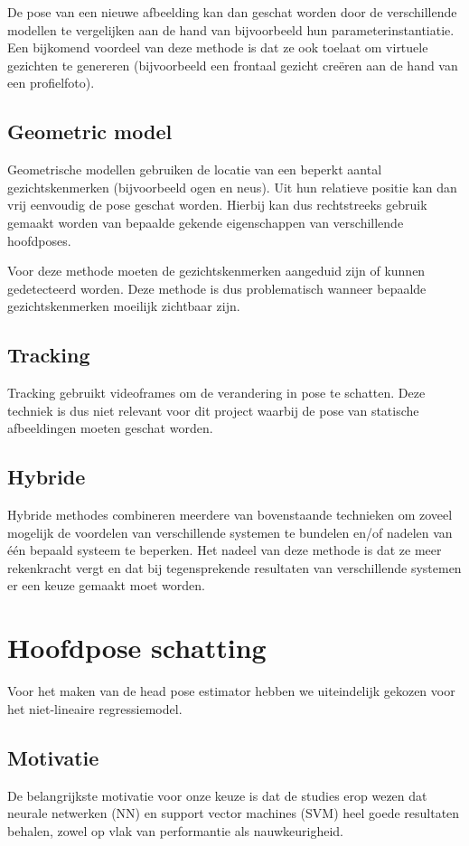 \documentclass[a4paper,dutch,11pt,]{scrartcl}
\begin{document}
De pose van een nieuwe afbeelding kan dan geschat worden door de verschillende modellen te vergelijken aan de hand van bijvoorbeeld hun parameterinstantiatie. Een bijkomend voordeel van deze methode is dat ze ook toelaat om virtuele gezichten te genereren (bijvoorbeeld een frontaal gezicht cre\"eren aan de hand van een profielfoto).

\subsection{Geometric model}
Geometrische modellen gebruiken de locatie van een beperkt aantal gezichtskenmerken (bijvoorbeeld ogen en neus). Uit hun relatieve positie kan dan vrij eenvoudig de pose geschat worden. Hierbij kan dus rechtstreeks gebruik gemaakt worden van bepaalde gekende eigenschappen van verschillende hoofdposes.

Voor deze methode moeten de gezichtskenmerken aangeduid zijn of kunnen gedetecteerd worden. Deze methode is dus problematisch wanneer bepaalde gezichtskenmerken moeilijk zichtbaar zijn.

\subsection{Tracking}
Tracking gebruikt videoframes om de verandering in pose te schatten. Deze techniek is dus niet relevant voor dit project waarbij de pose van statische afbeeldingen moeten geschat worden. %

\subsection{Hybride}
Hybride methodes combineren meerdere van bovenstaande technieken om zoveel mogelijk de voordelen van verschillende systemen te bundelen en/of nadelen van \'e\'en bepaald systeem te beperken. Het nadeel van deze methode is dat ze meer rekenkracht vergt en dat bij tegensprekende resultaten van verschillende systemen er een keuze gemaakt moet worden.

\section{Hoofdpose schatting}
Voor het maken van de head pose estimator hebben we uiteindelijk gekozen voor het niet-lineaire regressiemodel.
\subsection{Motivatie}
De belangrijkste motivatie voor onze keuze is dat de studies erop wezen dat neurale netwerken (NN) en support vector machines (SVM) heel goede resultaten behalen, zowel op vlak van performantie als nauwkeurigheid. 
\end{document}
